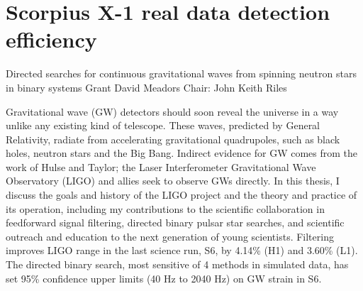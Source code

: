 \documentclass[leqno,twoside]{report}
\theoremstyle{plain}
\theoremstyle{definition}
\theoremstyle{remark}
\numberwithin{theorem}{chapter}        %
\begin{document}
\chapter{Scorpius X-1 real data detection efficiency}
\label{appendix2}





\startabstractpage
{Directed searches for continuous gravitational waves from spinning neutron stars in binary systems } {Grant David Meadors} {Chair: John Keith Riles}

Gravitational wave (GW) detectors should soon reveal the universe in a way unlike any existing kind of telescope. 
These waves, predicted by General Relativity, radiate from accelerating gravitational quadrupoles, such as black holes, neutron stars and the Big Bang. 
Indirect evidence for GW comes from the work of Hulse and Taylor; the Laser Interferometer Gravitational Wave Observatory (LIGO) and allies seek to observe GWs directly. 
In this thesis, I discuss the goals and history of the LIGO project and the theory and practice of its operation, including my contributions to the scientific collaboration in feedforward signal filtering, directed binary pulsar star searches, and scientific outreach and education to the next generation of young scientists. 
Filtering improves LIGO range in the last science run, S6, by 4.14\% (H1) and 3.60\% (L1). 
The directed binary search, most sensitive of 4 methods in simulated data, has set 95\% confidence upper limits (40 Hz to 2040 Hz) on GW strain in S6.
\end{document}
